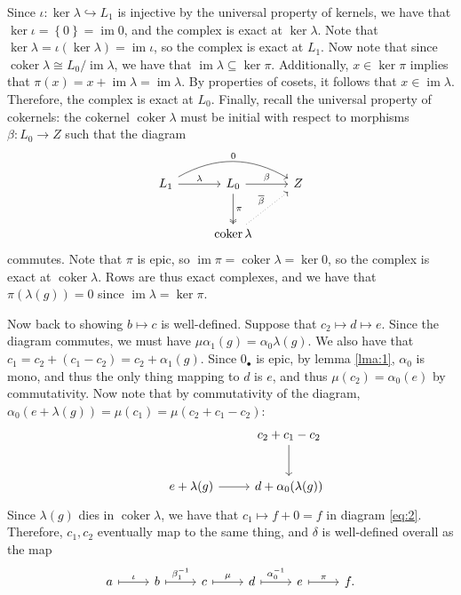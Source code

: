 \documentclass[11pt, letterpaper]{article}
\DeclareMathOperator{\im}{im}
\DeclareMathOperator{\coker}{coker}
\renewenvironment{proof}[1][]{\begin{replacementproof2}}{\end{replacementproof2}}
\begin{document}
\begin{proof}
Since $\iota : \ker \lambda \hookrightarrow L_1$ is injective by the universal property of kernels, we have that $\ker \iota =\left\{ 0 \right\} =\im 0$, and the complex is exact at $\ker \lambda $. Note that $\ker \lambda =\iota (\ker \lambda )=\im \iota $, so the complex is exact at $L_1$. Now note that since $\coker \lambda \cong L_0/\im \lambda $, we have that $\im \lambda \subseteq \ker \pi $. Additionally, $x\in \ker \pi $ implies that $\pi (x)=x+\im \lambda =\im \lambda $. By properties of cosets, it follows that $x\in \im \lambda $. Therefore, the complex is exact at $L_0$. Finally, recall the universal property of cokernels: the cokernel $\coker \lambda $ must be initial with respect to morphisms $\beta : L_0 \to Z $ such that the diagram
\[\begin{tikzcd}[row sep = 2.5em, column sep = 2.5em]
	L_1\arrow[rr, bend left, "0"]\arrow[r, "\lambda "]&L_0\arrow[r, "\beta "]\arrow[d, two heads, "\pi "]&Z\\
				&\coker \lambda \arrow[ru, dotted, "\overline{\beta}"]
\end{tikzcd}\]
commutes. Note that $\pi $ is epic, so $\im \pi = \coker \lambda =\ker 0$, so the complex is exact at $\coker \lambda $. Rows are thus exact complexes, and we have that $\pi (\lambda (g))=0$ since $\im \lambda = \ker \pi $.

Now back to showing $b\mapsto c$ is well-defined. Suppose that $c_2\mapsto d\mapsto e$. Since the diagram commutes, we must have $\mu \alpha_1(g)=\alpha_0\lambda (g)$. We also have that $c_1 = c_2+\left( c_1-c_2 \right) =c_2+\alpha_1(g)$. Since $0_\bullet $ is epic, by lemma \ref{lma:1}, $\alpha_0$ is mono, and thus the only thing mapping to $d$ is $e$, and thus $\mu (c_2)=\alpha_0(e)$ by commutativity. Now note that by commutativity of the diagram, $\alpha_0(e+\lambda (g))=\mu (c_1)=\mu (c_2+c_1-c_2)$:
\[\begin{tikzcd}[row sep = 2.5em, column sep = 2.5em]
	&&c_2+c_1-c_2\arrow[d]\\
	&e+\lambda (g)\arrow[r]&d+\alpha_0(\lambda (g))
\end{tikzcd}\]
Since $\lambda (g)$ dies in $\coker \lambda $, we have that $c_1\mapsto f+0=f$ in diagram \eqref{eq:2}. Therefore, $c_1,c_2$ eventually map to the same thing, and $\delta $ is well-defined overall as the map
\[\begin{tikzcd}[row sep = 2.5em, column sep = 2.5em]
	a\arrow[r, mapsto, "\iota "]&b\arrow[r, mapsto, "\beta _1^{-1} "]&c\arrow[r, mapsto, "\mu "]&d\arrow[r, mapsto, "\alpha_0^{-1} "]&e\arrow[r, mapsto, "\pi "]&f.
\end{tikzcd}\]


\end{proof}
\end{document}
